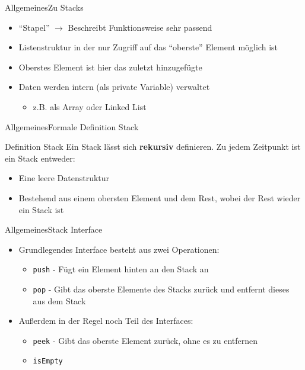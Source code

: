 \begin{frame}{Allgemeines}{Zu Stacks}
	\begin{itemize}
		\item "`Stapel"' $\rightarrow$ Beschreibt Funktionsweise sehr passend
		\item Listenstruktur in der nur Zugriff auf das "`oberste"' Element möglich ist
		\item Oberstes Element ist hier das zuletzt hinzugefügte
		\item Daten werden intern (als private Variable) verwaltet
		\begin{itemize}
			\item z.B. als Array oder Linked List
		\end{itemize}
	\end{itemize}
\end{frame}

\begin{frame}{Allgemeines}{Formale Definition Stack}
	\begin{alertblock}{Definition Stack}
	Ein Stack lässt sich \textbf{rekursiv} definieren. Zu jedem Zeitpunkt ist ein Stack entweder:
	\begin{itemize}
		\item Eine leere Datenstruktur
		\item Bestehend aus einem obersten Element und dem Rest, wobei der Rest wieder ein Stack ist
	\end{itemize}
	\end{alertblock}
\end{frame}

\begin{frame}{Allgemeines}{Stack Interface}
	\begin{itemize}
		\item Grundlegendes Interface besteht aus zwei Operationen:
		\begin{itemize}
			\item \texttt{push} - Fügt ein Element hinten an den Stack an
			\item \texttt{pop} - Gibt das oberste Elemente des Stacks zurück und entfernt dieses aus dem Stack
		\end{itemize}
		\item Außerdem in der Regel noch Teil des Interfaces:
		\begin{itemize}
			\item \texttt{peek} - Gibt das oberste Element zurück, ohne es zu entfernen
			\item \texttt{isEmpty}
		\end{itemize}
	\end{itemize}
\end{frame}

